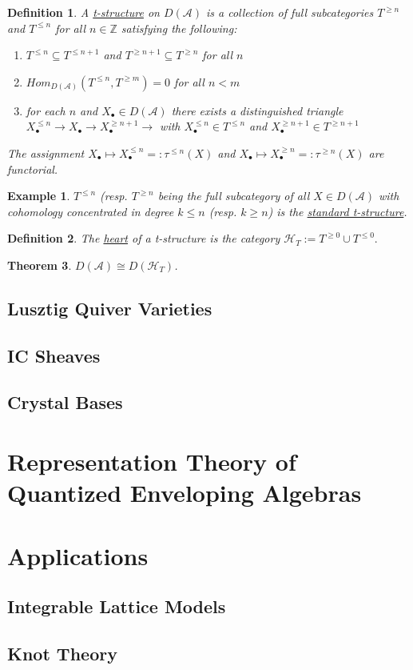 \documentclass{book}
\newtheorem{theorem}{Theorem}[section]
\newtheorem{definition}[theorem]{Definition}
\newtheorem{example}{Example}[section]
\begin{document}
\begin{definition}
A \underline{t-structure} on $D(\mathcal{A})$ is a collection of full subcategories $T^{\geq n}$ and $T^{\leq n}$ for all $n\in \mathbb{Z}$ satisfying the following:
\begin{enumerate}
\item $T^{\leq n} \subseteq T^{\leq n+1}$ and $T^{\geq n+1} \subseteq T^{\geq n}$ for all $n$ 
\item $Hom_{D(\mathcal{A})}(T^{\leq n}, T^{\geq m})=0$ for all $n<m$ 
\item for each $n$ and $X_{\bullet} \in D(\mathcal{A})$ there exists a distinguished triangle $X_{\bullet}^{\leq n} \rightarrow X_{\bullet} \rightarrow X_{\bullet}^{\geq n+1} \rightarrow $ with $X_{\bullet}^{\leq n} \in T^{\leq n}$ and $ X_{\bullet}^{\geq n+1} \in  T^{\geq n+1}$
\end{enumerate}
The assignment $X_{\bullet} \mapsto X_{\bullet}^{\leq n} =: \tau^{\leq n}(X)$ and $X_{\bullet} \mapsto X_{\bullet}^{\geq n} =: \tau^{\geq n}(X)$ are functorial. 
\end{definition}

\begin{example}
$T^{\leq n}$ (resp. $T^{\geq n}$ being the full subcategory of all $X \in D(\mathcal{A})$ with cohomology concentrated in degree $k\leq n$ (resp. $k\geq n$) is the \underline{standard t-structure}. 
\end{example}

\begin{definition}
The \underline{heart} of a t-structure is the category $\mathcal{H}_T :=T^{\geq 0} \cup T^{\leq 0}.$
\end{definition}

\begin{theorem}
$D(\mathcal{A})\cong D(\mathcal{H}_T)$. 
\end{theorem}


  \section{Lusztig Quiver Varieties}

  \section{IC Sheaves}

  \section{Crystal Bases}


\chapter{Representation Theory of Quantized Enveloping Algebras}


\chapter{Applications}

  \section{Integrable Lattice Models}

  \section{Knot Theory}
\end{document}
